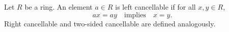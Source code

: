 Let $R$ be a ring. An element $a \in R$ is left cancellable if for all $x, y \in R$,
$$ax = ay \quad \text{implies} \quad x = y.$$
Right cancellable and two-sided cancellable are defined analogously.
